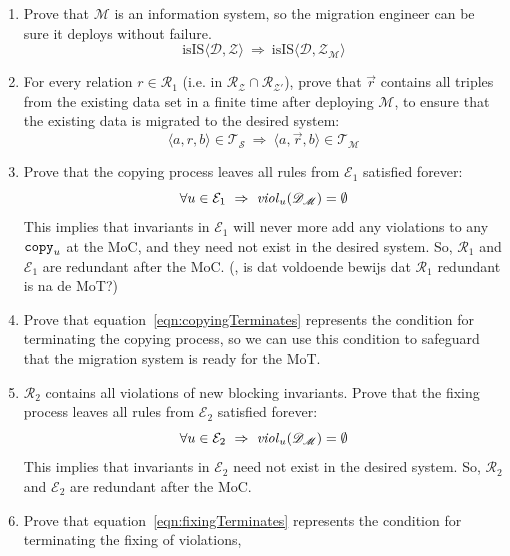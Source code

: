 \documentclass[runningheads]{llncs}
\newcommand{\id}[1]{\text{\it #1\/}}
\newcommand{\viol}[2]{\violC{#1}(#2)}
\newcommand{\violC}[1]{\id{viol}_{#1}}
\newcommand{\pair}[2]{\langle{#1},{#2}\rangle}
\newcommand{\triple}[3]{\langle{#1},{#2},{#3}\rangle}
\newcommand{\rels}{\mathcal{R}}   %
\newcommand{\triples}{\mathcal{T}}
\newcommand{\transactions}{\mathcal{E}}
\newcommand{\dataset}{\mathscr{D}}
\newcommand{\schema}{\mathscr{Z}}
\newcommand{\migrsys}{\mathscr{M}}
\newcommand{\infsys}{\mathscr{S}}
\begin{document}
\begin{enumerate}
\item Prove that $\migrsys$ is an information system,
      so the migration engineer can be sure it deploys without failure.
   \begin{equation}
      \text{isIS}\pair{\dataset}{\schema}\ \Rightarrow\ \text{isIS}\pair{\dataset}{\schema_\migrsys}
   \end{equation}
\item For every relation $r\in\rels_1$ (i.e. in $\rels_{\schema}\cap\rels_{\schema'}$), prove that $\overrightarrow{r}$ contains all triples from the existing data set in a finite time after deploying $\migrsys$,
      to ensure that the existing data is migrated to the desired system:
   \begin{equation}
      \triple{a}{r}{b}\in\triples_\infsys\ \Rightarrow\ \triple{a}{\overrightarrow{r}}{b}\in\triples_\migrsys
   \end{equation}
\item Prove that the copying process leaves all rules from $\transactions_1$ satisfied forever:
   \begin{equation}
      \forall u\in\transactions_1\ \Rightarrow\ \viol{u}{\dataset_\migrsys}=\emptyset
   \end{equation}
      This implies that invariants in $\transactions_1$ will never more add any violations to any ${\tt copy}_u$ at the MoC,
      and they need not exist in the desired system.
      So, $\rels_1$ and $\transactions_1$ are redundant after the MoC.
      (\@Bas, is dat voldoende bewijs dat $\rels_1$ redundant is na de MoT?)
\item Prove that equation~\ref{eqn:copyingTerminates} represents the condition for terminating the copying process,
      so we can use this condition to safeguard that the migration system is ready for the MoT.
\item $\rels_2$ contains all violations of new blocking invariants.
      Prove that the fixing process leaves all rules from $\transactions_2$ satisfied forever:
   \begin{equation}
      \forall u\in\transactions_2\ \Rightarrow\ \viol{u}{\dataset_\migrsys}=\emptyset
   \end{equation}
      This implies that invariants in $\transactions_2$ need not exist in the desired system.
      So, $\rels_2$ and $\transactions_2$ are redundant after the MoC.
\item Prove that equation~\ref{eqn:fixingTerminates} represents the condition for terminating the fixing of violations,

\end{enumerate}
\end{document}

